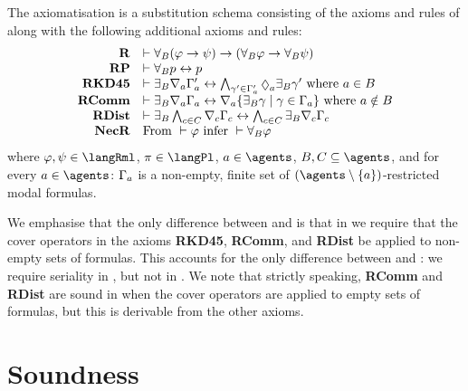 \begin{definition}
The axiomatisation \axiomRmlKD{} is a substitution schema consisting of the axioms and rules of \axiomKD{} along with the following additional axioms and rules:
$$
\begin{array}{rl}
    {\bf R} & \proves \allrefsBs (\phi \implies \psi) \implies (\allrefsBs \phi \implies \allrefsBs \psi)\\
    {\bf RP} & \proves \allrefsBs \atomP \iff \atomP\\
    {\bf RKD45} & \proves \somerefsBs \coversA \Gamma'_\agentA \iff \bigwedge_{\gamma' \in \Gamma'_\agentA} \possibleA \somerefsBs \gamma' \text{ where } \agentA \in \agentsB\\
    {\bf RComm} & \proves \somerefsBs \coversA \Gamma_\agentA \iff \coversA \{\somerefsBs \gamma \mid \gamma \in \Gamma_\agentA\} \text{ where } \agentA \notin \agentsB\\
    {\bf RDist} & \proves \somerefsBs \bigwedge_{\agentC \in \agentsC} \coversC \Gamma_\agentC \iff \bigwedge_{\agentC \in \agentsC} \somerefsBs \coversC \Gamma_\agentC\\
    {\bf NecR} & \text{From } \proves \phi \text{ infer } \proves \allrefsBs \phi
\end{array}
$$
where $\phi, \psi \in \langRml$, $\pi \in \langPl$, $\agentA \in \agents$, $\agentsB, \agentsC \subseteq \agents$, and for every $\agentA \in \agents$: $\Gamma_a$ is a non-empty, finite set of $(\agents \setminus \{\agentA\})$-restricted modal formulas.
\end{definition}

We emphasise that the only difference between \axiomRmlKFF{} and \axiomRmlKD{} is that in \axiomRmlKD{} we require that the cover operators in the axioms {\bf RKD45}, {\bf RComm}, and {\bf RDist} be applied to non-empty sets of formulas.
This accounts for the only difference between \classKFF{} and \classKD{}: we require seriality in \classKD{}, but not in \classKFF{}.
We note that strictly speaking, {\bf RComm} and {\bf RDist} are sound in \logicRmlKD{} when the cover operators are applied to empty sets of formulas, but this is derivable from the other axioms.

\section{Soundness}\label{rml-kd45-soundness}

